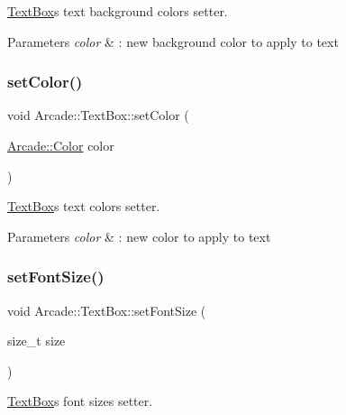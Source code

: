 \hyperlink{class_arcade_1_1_text_box}{Text\+Box}\textquotesingle{}s text background color\textquotesingle{}s setter. 


\begin{DoxyParams}{Parameters}
{\em color} & \+: new background color to apply to text \\
\hline
\end{DoxyParams}
\mbox{\label{class_arcade_1_1_text_box_acd8eccc744d276c3be9a16facf7449b7}} 
\subsubsection{\texorpdfstring{set\+Color()}{setColor()}}
{\footnotesize\ttfamily void Arcade\+::\+Text\+Box\+::set\+Color (\begin{DoxyParamCaption}\item[{\hyperlink{class_arcade_1_1_color}{Arcade\+::\+Color}}]{color }\end{DoxyParamCaption})}



\hyperlink{class_arcade_1_1_text_box}{Text\+Box}\textquotesingle{}s text color\textquotesingle{}s setter. 


\begin{DoxyParams}{Parameters}
{\em color} & \+: new color to apply to text \\
\hline
\end{DoxyParams}
\mbox{\label{class_arcade_1_1_text_box_ad65297c8da7cf939ee635191269f4440}} 
\subsubsection{\texorpdfstring{set\+Font\+Size()}{setFontSize()}}
{\footnotesize\ttfamily void Arcade\+::\+Text\+Box\+::set\+Font\+Size (\begin{DoxyParamCaption}\item[{size\+\_\+t}]{size }\end{DoxyParamCaption})}



\hyperlink{class_arcade_1_1_text_box}{Text\+Box}\textquotesingle{}s font size\textquotesingle{}s setter. 


